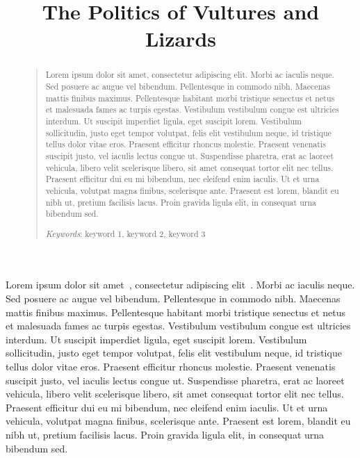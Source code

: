\documentclass[a4paper,man,donotrepeattitle,natbib]{apa6}
\title{\Large{\textbf{The Politics of Vultures and Lizards}}}
\date{}
\author{}
\affiliation{\mbox{}}
\makeatletter
\renewcommand{\maketitle}{\bgroup\setlength{\parindent}{0pt}
\begin{flushleft}
  \textbf{\@title}

  \@author
\end{flushleft}\egroup
}
\makeatother
\begin{document}
\begin{titlingpage}

\maketitle

\begin{abstract}

\vspace*{\baselineskip}


\begin{quote}

Lorem ipsum dolor sit amet, consectetur adipiscing elit. Morbi ac iaculis neque. Sed posuere ac augue vel bibendum. Pellentesque in commodo nibh. Maecenas mattis finibus maximus. Pellentesque habitant morbi tristique senectus et netus et malesuada fames ac turpis egestas. Vestibulum vestibulum congue est ultricies interdum. Ut suscipit imperdiet ligula, eget suscipit lorem. Vestibulum sollicitudin, justo eget tempor volutpat, felis elit vestibulum neque, id tristique tellus dolor vitae eros. Praesent efficitur rhoncus molestie. Praesent venenatis suscipit justo, vel iaculis lectus congue ut. Suspendisse pharetra, erat ac laoreet vehicula, libero velit scelerisque libero, sit amet consequat tortor elit nec tellus. Praesent efficitur dui eu mi bibendum, nec eleifend enim iaculis. Ut et urna vehicula, volutpat magna finibus, scelerisque ante. Praesent est lorem, blandit eu nibh ut, pretium facilisis lacus. Proin gravida ligula elit, in consequat urna bibendum sed.

\vspace*{\baselineskip}

\textit{Keywords}: keyword 1, keyword 2, keyword 3
\end{quote}
\end{abstract}


\end{titlingpage}

Lorem ipsum dolor sit amet~\citep{ogada2012dropping, schoener1970nonsynchronous}, consectetur adipiscing elit~\citep{sexton1975black}. Morbi ac iaculis neque. Sed posuere ac augue vel bibendum. Pellentesque in commodo nibh. Maecenas mattis finibus maximus. Pellentesque habitant morbi tristique senectus et netus et malesuada fames ac turpis egestas. Vestibulum vestibulum congue est ultricies interdum. Ut suscipit imperdiet ligula, eget suscipit lorem. Vestibulum sollicitudin, justo eget tempor volutpat, felis elit vestibulum neque, id tristique tellus dolor vitae eros. Praesent efficitur rhoncus molestie. Praesent venenatis suscipit justo, vel iaculis lectus congue ut. Suspendisse pharetra, erat ac laoreet vehicula, libero velit scelerisque libero, sit amet consequat tortor elit nec tellus. Praesent efficitur dui eu mi bibendum, nec eleifend enim iaculis. Ut et urna vehicula, volutpat magna finibus, scelerisque ante. Praesent est lorem, blandit eu nibh ut, pretium facilisis lacus. Proin gravida ligula elit, in consequat urna bibendum sed.
\end{document}
